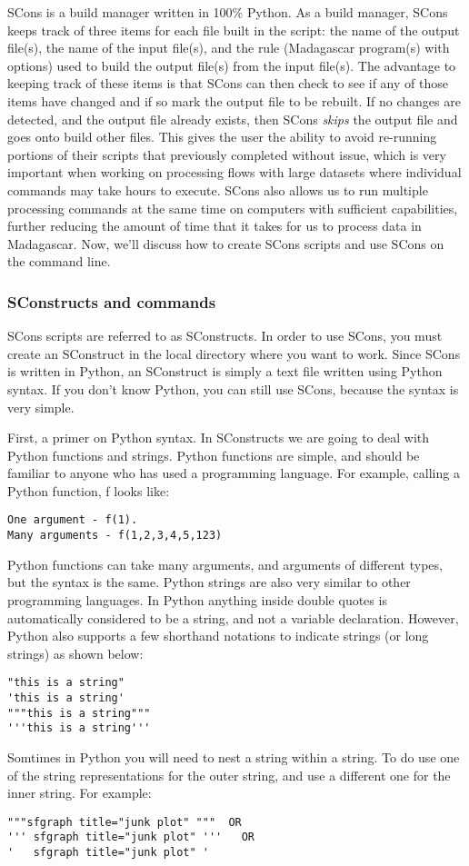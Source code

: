 SCons is a build manager written in 100\% Python.  As a build manager, SCons keeps track of three items for each file built in the script: the name of the output file(s), the name of the input file(s), and the rule (Madagascar program(s) with options) used to build the output file(s) from the input file(s).  The advantage to keeping track of these items is that SCons can then check to see if any of those items have changed and if so mark the output file to be rebuilt.  If no changes are detected, and the output file already exists, then SCons \emph{skips} the output file and goes onto build other files.  This gives the user the ability to avoid re-running portions of their scripts that previously completed without issue, which is very important when working on processing flows with large datasets where individual commands may take hours to execute.  SCons also allows us to run multiple processing commands at the same time on computers with sufficient capabilities, further reducing the amount of time that it takes for us to process data in Madagascar.  Now, we'll discuss how to create SCons scripts and use SCons on the command line.

\subsubsection{SConstructs and commands}

SCons scripts are referred to as SConstructs.  In order to use SCons, you must create an SConstruct in the local directory where you want to work. Since SCons is written in Python, an SConstruct is simply a text file written using Python syntax.  If you don't know Python, you can still use SCons, because the syntax is very simple.

First, a primer on Python syntax.  In SConstructs we are going to deal with Python functions and strings.  Python functions are simple, and should be familiar to anyone who has used a programming language.  For example, calling a Python function, f looks like:
\begin{verbatim}
One argument - f(1).
Many arguments - f(1,2,3,4,5,123)
\end{verbatim}
Python functions can take many arguments, and arguments of different types, but the syntax is the same.  Python strings are also very similar to other programming languages.  In Python anything inside double quotes is automatically considered to be a string, and not a variable declaration.  However, Python also supports a few shorthand notations to indicate strings (or long strings) as shown below:
\begin{verbatim}
"this is a string"
'this is a string'
"""this is a string"""
'''this is a string'''
\end{verbatim}
Somtimes in Python you will need to nest a string within a string.  To do use one of the string representations for the outer string, and use a different one for the inner string.  For example:
\begin{verbatim}
"""sfgraph title="junk plot" """  OR
''' sfgraph title="junk plot" '''   OR
'   sfgraph title="junk plot" ' 
\end{verbatim}

